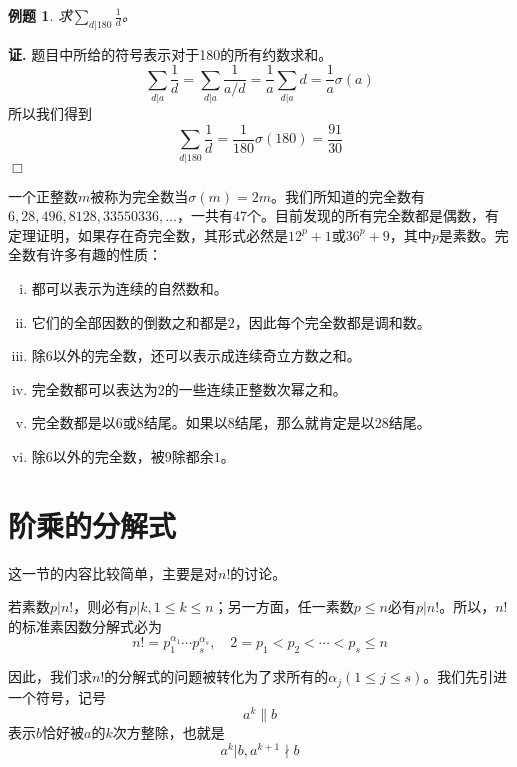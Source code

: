 \documentclass{ctexrep}
\newtheorem{exmp}{例题}[section]
\renewenvironment{proof}[1][证]{\noindent \textbf{#1.} }{\hfill$\Box$}
\begin{document}
\begin{exmp}
求$\displaystyle \sum_{d|180}\frac{1}{d}$。
\end{exmp}
\begin{proof}
题目中所给的符号表示对于180的所有约数求和。
\begin{displaymath}
\sum_{d|a}\frac{1}{d}=\sum_{d|a}\frac{1}{a/d}=\frac{1}{a}\sum_{d|a}d=\frac{1}{a}\sigma(a)
\end{displaymath}
所以我们得到
\begin{displaymath}
\sum_{d|180}\frac{1}{d}=\frac{1}{180}\sigma(180)=\frac{91}{30}
\end{displaymath}
\end{proof}

一个正整数$m$被称为完全数当$\sigma(m)=2m$。我们所知道的完全数有$6,28,496,8128,33550336,\dotsc$，一共有$47$个。目前发现的所有完全数都是偶数，有定理证明，如果存在奇完全数，其形式必然是$12^p+1$或$36^p+9$，其中$p$是素数。完全数有许多有趣的性质：
\begin{enumerate}[(i)]
\item 都可以表示为连续的自然数和。
\item 它们的全部因数的倒数之和都是$2$，因此每个完全数都是调和数。
\item 除$6$以外的完全数，还可以表示成连续奇立方数之和。
\item 完全数都可以表达为$2$的一些连续正整数次幂之和。
\item 完全数都是以$6$或$8$结尾。如果以$8$结尾，那么就肯定是以$28$结尾。
\item 除$6$以外的完全数，被$9$除都余$1$。
\end{enumerate}

\section{阶乘的分解式}
这一节的内容比较简单，主要是对$n!$的讨论。

若素数$p|n!$，则必有$p|k,1\leq k\leq n$；另一方面，任一素数$p\leq n$必有$p|n!$。所以，$n!$的标准素因数分解式必为
\begin{displaymath}
n!=p_1^{\alpha_1} \dotsm p_s^{\alpha_s},\quad 2=p_1<p_2<\dotsb<p_s\leq n
\end{displaymath}

因此，我们求$n!$的分解式的问题被转化为了求所有的$\alpha_j(1\leq j\leq s)$。我们先引进一个符号，记号
\begin{displaymath}
a^k\parallel b
\end{displaymath}
表示$b$恰好被$a$的$k$次方整除，也就是
\begin{displaymath}
a^k|b,a^{k+1}\nmid b
\end{displaymath}
\end{document}
